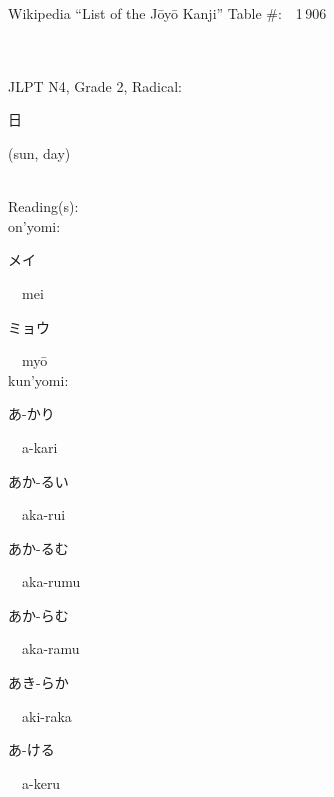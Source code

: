 \begin{multicols}{2}
Wikipedia ``List of the J\=oy\=o Kanji'' Table \#:\ \ 1\,906 \\
\ \ \\
{\fontsize{34pt}{40pt}  }\ \ \\  %
{JLPT N4, Grade 2, Radical:\ \ {\begin{CJK}{UTF8}{min} 日 \end{CJK}} (sun, day) } \\
Reading(s):\ \ \\
{\hspace*{1em}}on'yomi:\ \ \\
{\hspace*{2em}}{\begin{CJK}{UTF8}{min} メイ \end{CJK}}\ \ mei\ \ \\
{\hspace*{2em}}{\begin{CJK}{UTF8}{min} ミョウ \end{CJK}}\ \ my\=o\ \ \\
{\hspace*{1em}}kun'yomi:\ \ \\
{\hspace*{2em}}{\begin{CJK}{UTF8}{min} あ-かり \end{CJK}}\ \ a-kari\ \ \\
{\hspace*{2em}}{\begin{CJK}{UTF8}{min} あか-るい \end{CJK}}\ \ aka-rui\ \ \\
{\hspace*{2em}}{\begin{CJK}{UTF8}{min} あか-るむ \end{CJK}}\ \ aka-rumu\ \ \\
{\hspace*{2em}}{\begin{CJK}{UTF8}{min} あか-らむ \end{CJK}}\ \ aka-ramu\ \ \\
{\hspace*{2em}}{\begin{CJK}{UTF8}{min} あき-らか \end{CJK}}\ \ aki-raka\ \ \\
{\hspace*{2em}}{\begin{CJK}{UTF8}{min} あ-ける \end{CJK}}\ \ a-keru\ \ \\

\end{multicols}
